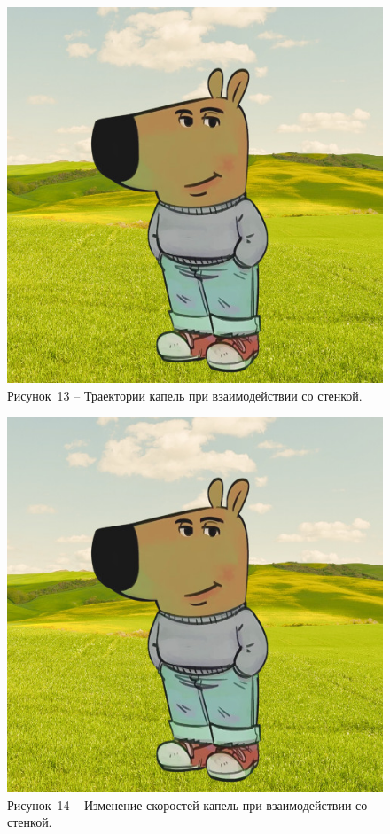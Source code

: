 \begin{figure}[H]
	\centering
	\includegraphics[width=\textwidth]{figures/chill-guy.jpeg}
	\caption*{Рисунок~13 – Траектории капель при взаимодействии со стенкой.}
	\label{fig:-11}
\end{figure}

\begin{figure}[H]
	\centering
	\includegraphics[width=\textwidth]{figures/chill-guy.jpeg}
	\caption*{Рисунок~14 – Изменение скоростей капель при взаимодействии со стенкой.}
	\label{fig:-12}
\end{figure}


